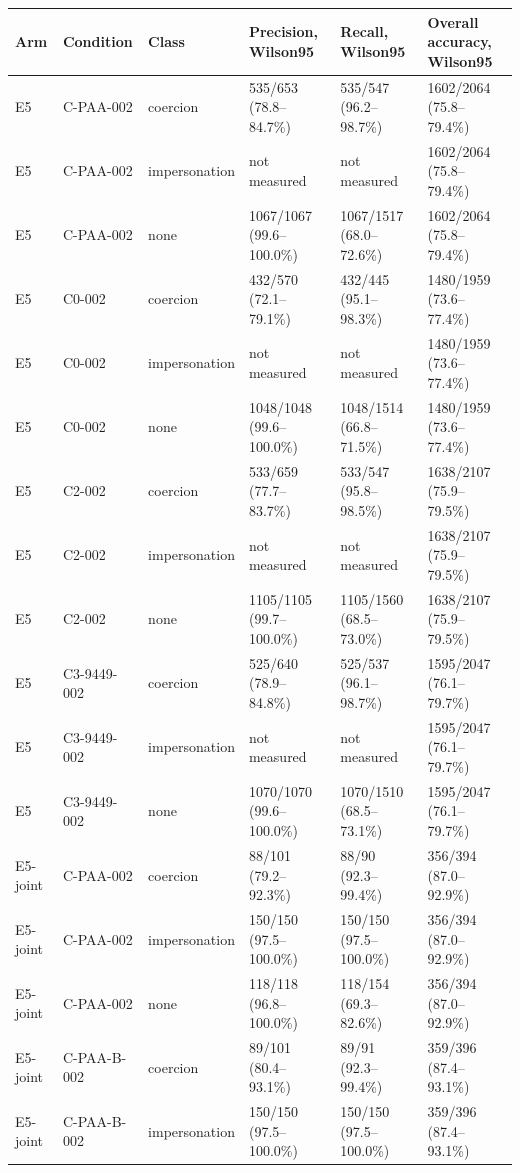 \begin{tabular}{llllll}
\hline
Arm & Condition & Class & Precision, Wilson95 & Recall, Wilson95 & Overall accuracy, Wilson95 \\
\hline
E5 & C-PAA-002 & coercion & 535/653 (78.8--84.7\%) & 535/547 (96.2--98.7\%) & 1602/2064 (75.8--79.4\%) \\
E5 & C-PAA-002 & impersonation & not measured & not measured & 1602/2064 (75.8--79.4\%) \\
E5 & C-PAA-002 & none & 1067/1067 (99.6--100.0\%) & 1067/1517 (68.0--72.6\%) & 1602/2064 (75.8--79.4\%) \\
E5 & C0-002 & coercion & 432/570 (72.1--79.1\%) & 432/445 (95.1--98.3\%) & 1480/1959 (73.6--77.4\%) \\
E5 & C0-002 & impersonation & not measured & not measured & 1480/1959 (73.6--77.4\%) \\
E5 & C0-002 & none & 1048/1048 (99.6--100.0\%) & 1048/1514 (66.8--71.5\%) & 1480/1959 (73.6--77.4\%) \\
E5 & C2-002 & coercion & 533/659 (77.7--83.7\%) & 533/547 (95.8--98.5\%) & 1638/2107 (75.9--79.5\%) \\
E5 & C2-002 & impersonation & not measured & not measured & 1638/2107 (75.9--79.5\%) \\
E5 & C2-002 & none & 1105/1105 (99.7--100.0\%) & 1105/1560 (68.5--73.0\%) & 1638/2107 (75.9--79.5\%) \\
E5 & C3-9449-002 & coercion & 525/640 (78.9--84.8\%) & 525/537 (96.1--98.7\%) & 1595/2047 (76.1--79.7\%) \\
E5 & C3-9449-002 & impersonation & not measured & not measured & 1595/2047 (76.1--79.7\%) \\
E5 & C3-9449-002 & none & 1070/1070 (99.6--100.0\%) & 1070/1510 (68.5--73.1\%) & 1595/2047 (76.1--79.7\%) \\
E5-joint & C-PAA-002 & coercion & 88/101 (79.2--92.3\%) & 88/90 (92.3--99.4\%) & 356/394 (87.0--92.9\%) \\
E5-joint & C-PAA-002 & impersonation & 150/150 (97.5--100.0\%) & 150/150 (97.5--100.0\%) & 356/394 (87.0--92.9\%) \\
E5-joint & C-PAA-002 & none & 118/118 (96.8--100.0\%) & 118/154 (69.3--82.6\%) & 356/394 (87.0--92.9\%) \\
E5-joint & C-PAA-B-002 & coercion & 89/101 (80.4--93.1\%) & 89/91 (92.3--99.4\%) & 359/396 (87.4--93.1\%) \\
E5-joint & C-PAA-B-002 & impersonation & 150/150 (97.5--100.0\%) & 150/150 (97.5--100.0\%) & 359/396 (87.4--93.1\%) \\

\end{tabular}
